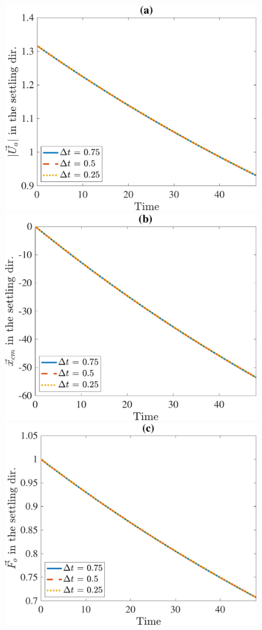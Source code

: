 \begin{figure}[ht]
	\begin{center}
		\includegraphics[scale=0.2]{./figures/fig_NC10_dt_Ua3_all}
		\includegraphics[scale=0.2]{./figures/fig_NC10_dt_cm3_all}
		\includegraphics[scale=0.2]{./figures/fig_NC10_dt_Fo3_all}

\end{center}
\end{figure}
